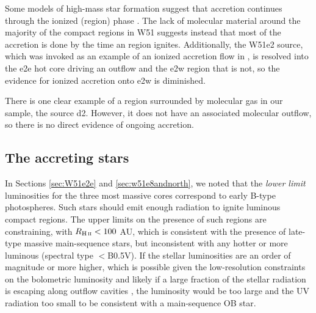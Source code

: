 \documentclass{emulateapj}
\begin{document}
Some models of high-mass star formation suggest that accretion continues
through the ionized (\hii region) phase \citep{Keto2002b,Keto2003a}.  The lack
of molecular material around the majority of the compact \hii regions in W51
suggests instead that most of the accretion is done by the time an \hii region
ignites.  Additionally, the W51e2 source, which was invoked as an example of an
ionized accretion flow in \citet{Keto2008a}, is  resolved into the e2e
hot core driving an outflow and the e2w \hchii region that is not, so the
evidence for ionized accretion onto e2w is diminished.

There is one clear example of a \hchii region surrounded by molecular gas in
our sample, the source d2.  However, it does not have an associated molecular
outflow, so there is no direct evidence of ongoing accretion.

% 

\subsection{The accreting stars}
\label{sec:stellarproperties}
In Sections \ref{sec:W51e2e} and \ref{sec:w51e8andnorth}, we noted that the
\emph{lower limit} luminosities for the three most massive cores correspond to
early B-type photospheres.  Such stars should emit enough radiation to ignite
luminous compact \hii regions. %
The upper limits on the presence of such  \hii regions are constraining, with
$R_{\scriptsize{\hii}}<100$ AU, which is consistent with the presence of
late-type massive main-sequence stars, but inconsistent with any hotter or more
luminous
(spectral type $<$B0.5V).
If the stellar luminosities are an order of magnitude or more higher, which is
possible given the low-resolution constraints on the bolometric luminosity
\citep{Ginsburg2016a,Sievers1991a}
and likely if a large fraction of the stellar radiation is escaping along outflow
cavities \citep{Kuiper2012a,Zhang2013h}, the luminosity would be too large and
the UV radiation too small to be consistent with a main-sequence OB star.
\end{document}
